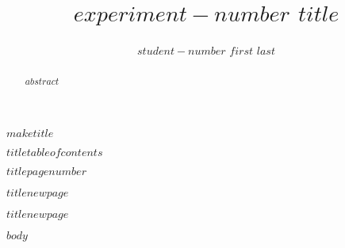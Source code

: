 \documentclass[uplatex,dvipdfmx,a4paper,10pt]{jsarticle}
\title{$experiment-number$ $title$}
\author{$student-number$ $first$ $last$}
\begin{document}
$maketitle$

\begin{abstract}$abstract$\end{abstract}
	
$titletableofcontents$

$titlepagenumber$

$titlenewpage$

$titlenewpage$

%
$body$
\printbibliography[title=参考文献]
\end{document}
